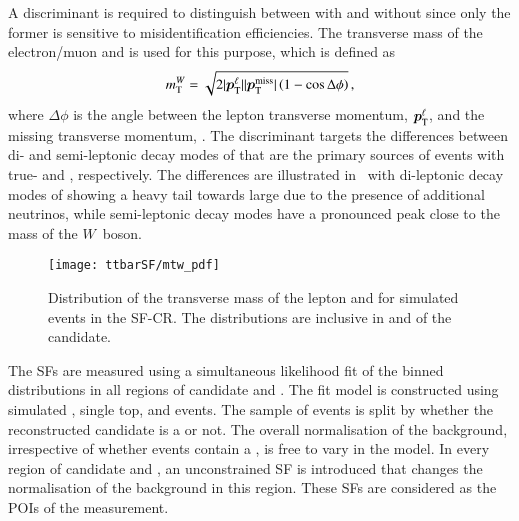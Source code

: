 A discriminant is required to distinguish between \ttbar with and without
\faketauhadvis since only the former is sensitive to \jettotauhadvis
misidentification efficiencies. The transverse mass of the electron/muon and
\pTmissAbs is used for this purpose, which is defined as
\begin{align*}
  m_{\text{T}}^W = \sqrt{2 | \bm{p}_{\text{T}}^{\ell} | | \bm{p}_{\text{T}}^{\text{miss}} | \left( 1 - \cos \Delta\phi \right)} \,\text{,}
\end{align*}
where $\Delta \phi$ is the angle between the lepton transverse momentum,
$\bm{p}_{\text{T}}^{\ell}$, and the missing transverse momentum, \pTmiss. The
\mTW discriminant targets the differences between di- and semi-leptonic decay
modes of \ttbar that are the primary sources of events with true- and
\faketauhadvis, respectively. The differences are illustrated
in~ with di-leptonic decay modes of \ttbar showing a
heavy tail towards large \mTW due to the presence of additional neutrinos, while
semi-leptonic decay modes have a pronounced peak close to the mass of the
$W$~boson.


\begin{figure}[htbp]
  \centering

  \texttt{[image: ttbarSF/mtw\_pdf]}

  \caption[Distribution of the transverse mass of the lepton and \pTmiss for
  simulated \ttbar events in the SF-CR.]{Distribution of the transverse mass of
    the lepton and \pTmiss for simulated \ttbar events in the SF-CR. The
    distributions are inclusive in \pT and \Ntracks of the \tauhadvis
    candidate.}%
  \label{fig:ttbarsf_mtw_pdf}
\end{figure}

The \faketauhadvis SFs are measured using a simultaneous likelihood fit of the
binned \mTW distributions in all regions of \tauhadvis candidate \pT and
\Ntracks. The fit model is constructed using simulated \ttbar, single top, and
\Vjets events. The sample of \ttbar events is split by whether the reconstructed
\tauhadvis candidate is a \faketauhadvis or not. The overall normalisation of
the \ttbar background, irrespective of whether events contain a \faketauhadvis,
is free to vary in the model.  In every region of \tauhadvis candidate
\Ntracks and \pT, an unconstrained SF is introduced that changes the
normalisation of the \ttbarFakes background in this region. These \faketauhadvis
SFs are considered as the POIs of the measurement.

